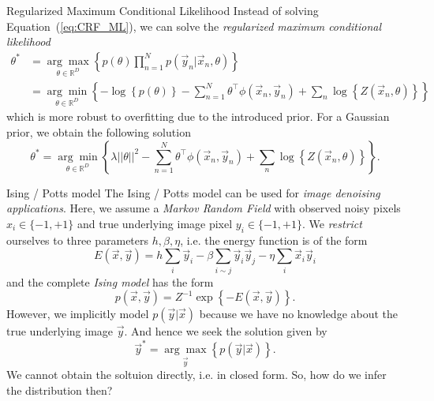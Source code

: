 \begin{topic}{0.3cm}{Regularized Maximum Conditional Likelihood}
	Instead of solving Equation~(\ref{eq:CRF_ML}), we can solve the \emph{regularized maximum conditional likelihood}
	\begin{equation}
	\begin{aligned}
		\theta^*
		&= \underset{\theta\in\mathbb{R}^D}{\arg\max} \left\{ p(\theta) \prod_{n=1}^N p(\vec{y}_n | \vec{x}_n , \theta ) \right\}\\
		&= \underset{\theta\in\mathbb{R}^D}{\arg\min} \left\{ -\log\left\{ p(\theta) \right\} -\sum_{n=1}^N \theta^\top \phi(\vec{x}_n,\vec{y}_n) + \sum_n \log\left\{ Z(\vec{x}_n,\theta) \right\} \right\}
	\end{aligned}
	\end{equation}
	which is more robust to overfitting due to the introduced prior. %
	For a Gaussian prior, we obtain the following solution %
	\begin{equation}
		\theta^* = \underset{\theta\in\mathbb{R}^D}{\arg\min}\left\{ \lambda ||\theta||^2 - \sum_{n=1}^N \theta^\top \phi(\vec{x}_n,\vec{y}_n) + \sum_n \log\left\{ Z(\vec{x}_n,\theta) \right\} \right\}. %
	\end{equation}
\end{topic}
\newpage
\begin{topic}{0.3cm}{Ising / Potts model}
	The Ising / Potts model can be used for \emph{image denoising applications}. %
	Here, we assume a \emph{Markov Random Field} with observed noisy pixels \ensuremath{x_i \in \{-1,+1\}} and true underlying image pixel \ensuremath{y_i \in \{-1,+1\}}. %
	We \textit{restrict} ourselves to three parameters \ensuremath{h,\beta,\eta}, i.e. the energy function is of the form %
	\begin{equation}
		E(\vec{x},\vec{y}) = h \sum_i \vec{y}_i - \beta \sum_{i\sim j} \vec{y}_i \vec{y}_j - \eta \sum_i \vec{x}_i \vec{y}_i
	\end{equation}
	and the complete \emph{Ising model} has the form %
	\begin{equation}
		p(\vec{x},\vec{y}) = Z^{-1} \exp\left\{ -E(\vec{x},\vec{y}) \right\}. %
	\end{equation}
	However, we implicitly model \ensuremath{p(\vec{y}|\vec{x})} because we have no knowledge about the true underlying image \ensuremath{\vec{y}}. %
	And hence we seek the solution given by %
	\begin{equation}
		\vec{y}^* = \underset{\vec{y}}{\arg\max} \left\{ p(\vec{y}|\vec{x}) \right\}. %
	\end{equation}
	We cannot obtain the soltuion directly, i.e. in closed form. %
	So, how do we infer the distribution then? %
\end{topic}
